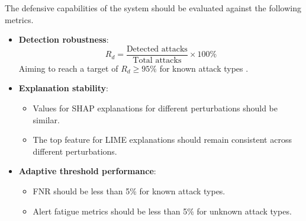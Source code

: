 \noindent The defensive capabilities of the system should be evaluated against the following metrics.

\begin{itemize}
  \item \textbf{Detection robustness}:
  \begin{equation}
    R_d = \frac{\text{Detected attacks}}{\text{Total attacks}} \times 100\%
  \end{equation}
  Aiming to reach a target of $R_d \geq 95\%$ for known attack types \citep{atlam2022business}.
  \item \textbf{Explanation stability}:
  \begin{itemize}
    \item Values for SHAP explanations for different perturbations should be similar.
    \item The top feature for LIME explanations should remain consistent across different perturbations.
  \end{itemize}
  \item \textbf{Adaptive threshold performance}:
  \begin{itemize}
    \item FNR should be less than 5\% for known attack types.
    \item Alert fatigue metrics should be less than 5\% for unknown attack types.
  \end{itemize}
\end{itemize}
